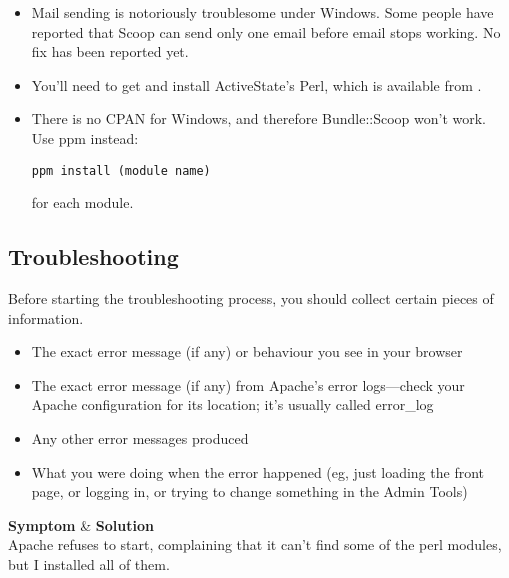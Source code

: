 \begin{itemize}
\item Mail sending is notoriously troublesome under Windows.  Some people have reported that Scoop can send only one email before email stops working. No fix has been reported yet.
\item You'll need to get and install ActiveState's Perl, which is available from .
\item There is no CPAN for Windows, and therefore Bundle::Scoop won't work. Use ppm instead:
\begin{verbatim}
ppm install (module name)
\end{verbatim}
for each module.
\end{itemize}

\subsection{Troubleshooting}
\label{install-troubleshooting}

Before starting the troubleshooting process, you should collect certain pieces of information.

\begin{itemize}
\item The exact error message (if any) or behaviour you see in your browser
\item The exact error message (if any) from Apache's error logs---check your Apache configuration for its location; it's usually called error\_log
\item Any other error messages produced
\item What you were doing when the error happened (eg, just loading the front page, or logging in, or trying to change something in the Admin Tools)
\end{itemize}

\html{\begin{table}[htp]}
\hline
{\bf Symptom} & {\bf Solution} \\
\hline
\latex{\endfirsthead}
\latex{\hline}
\latex{\hline}
\latex{\endhead}
\latex{\hline}
\latex{\endfoot}
Apache refuses to start, complaining that it can't find some of the perl modules, but I installed all of them.  

